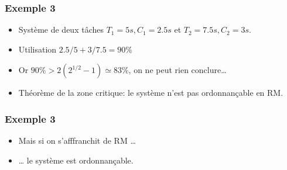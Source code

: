 \documentclass[ignorenonframetext,]{beamer}
\begin{document}
\begin{frame}\frametitle{Exemple 3}

\begin{itemize}
\item
  Système de deux tâches $T_1 = 5s, C_1 = 2.5s$ et
  $T_2 = 7.5s , C_2=3s$.
\item
  Utilisation $2.5/5 + 3/7.5 = 90 \%$
\item
  Or $90\% > 2(2^{1/2} - 1) \simeq 83\%$, on ne peut rien
  conclure\ldots{}
\end{itemize}

\begin{center}

\begin{RTGrid}[width=6cm]{2}{20}





\end{RTGrid}
\end{center}

\begin{itemize}
\item
  Théorème de la zone critique: le système n'est pas ordonnançable en
  RM.
\end{itemize}

\end{frame}

\begin{frame}\frametitle{Exemple 3}

\begin{itemize}
\item
  Mais si on s'afffranchit de RM \ldots{}
\end{itemize}

\begin{center}

\begin{RTGrid}[width=6cm]{2}{20}





\end{RTGrid}

\end{center}

\begin{itemize}
\item
  \ldots{} le système est ordonnançable.
\end{itemize}

\end{frame}
\end{document}
